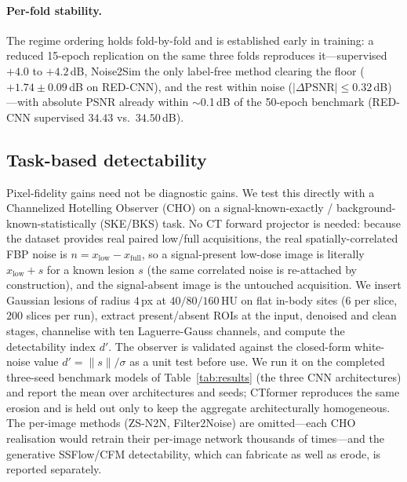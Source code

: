\documentclass[letterpaper]{article} %
\begin{document}
\paragraph{Per-fold stability.}
The regime ordering holds fold-by-fold and is established early in training: a
reduced 15-epoch replication on the same three folds reproduces it---supervised
$+4.0$ to $+4.2$\,dB, Noise2Sim the only label-free method clearing the floor
($+1.74{\pm}0.09$\,dB on RED-CNN), and the rest within noise
($|\Delta\text{PSNR}|\le0.32$\,dB)---with absolute PSNR already within
$\sim$0.1\,dB of the 50-epoch benchmark (RED-CNN supervised $34.43$ vs.\
$34.50$\,dB).

\subsection{Task-based detectability}
\label{sec:detect}


Pixel-fidelity gains need not be diagnostic gains.  We test this directly with
a Channelized Hotelling Observer (CHO) on a signal-known-exactly /
background-known-statistically (SKE/BKS) task.  No CT forward projector is
needed: because the dataset provides real paired low/full acquisitions, the
real spatially-correlated FBP noise is $n = x_\text{low} - x_\text{full}$, so a
signal-present low-dose image is literally $x_\text{low} + s$ for a known
lesion $s$ (the same correlated noise is re-attached by construction), and the
signal-absent image is the untouched acquisition.  We insert Gaussian lesions of
radius $4$\,px at $40/80/160$\,HU on flat in-body sites ($6$ per slice, $200$
slices per run), extract present/absent ROIs at the input, denoised
and clean stages, channelise with ten Laguerre-Gauss channels, and compute
the detectability index $d'$.  The observer is validated against the closed-form
white-noise value $d' = \lVert s\rVert / \sigma$ as a unit test before use.  We
run it on the completed three-seed benchmark models of
Table~\ref{tab:results} (the three CNN architectures) and report the
mean over architectures and seeds; CTformer reproduces the same erosion and is
held out only to keep the aggregate architecturally homogeneous.  The
per-image methods (ZS-N2N, Filter2Noise) are omitted---each CHO realisation would
retrain their per-image network thousands of times---and the generative
SSFlow/CFM detectability, which can fabricate as well as erode, is reported
separately.
\end{document}
